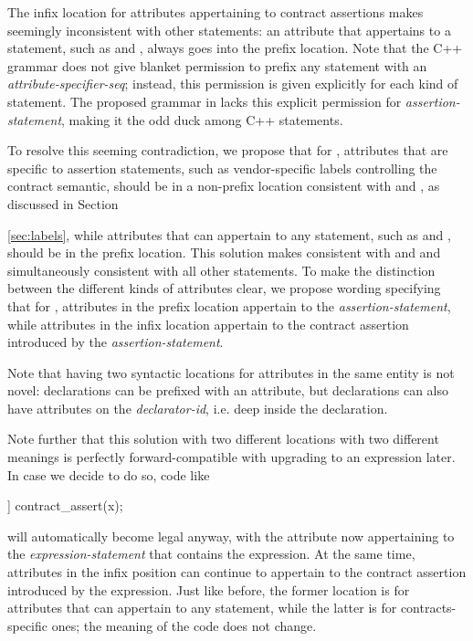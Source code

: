 The infix location for attributes appertaining to contract assertions makes  seemingly inconsistent with other statements: an attribute that appertains to a statement, such as \tcode{[[likely]]} and \tcode{[[unlikely]]}, always goes into the prefix location. Note that the C++ grammar does not give blanket permission to prefix any statement with an  \emph{attribute-specifier-seq}; instead, this permission is given explicitly for each kind of statement. The proposed grammar in \cite{P2900R5} lacks this explicit permission for \emph{assertion-statement}, making it the odd duck among C++ statements.

To resolve this seeming contradiction, we propose that for , attributes that are specific to assertion statements, such as vendor-specific labels controlling the contract semantic, should be in a non-prefix location consistent with  and , as discussed in Section {\ref{sec:labels}, while attributes that can appertain to any statement, such as \tcode{[[likely]]} and \tcode{[[unlikely]]}, should be in the prefix location. This solution makes  consistent with  and  and simultaneously consistent with all other statements. To make the distinction between the different kinds of attributes clear, we propose wording specifying that for , attributes in the prefix location appertain to the \emph{assertion-statement}, while attributes in the infix location appertain to the contract assertion introduced by the \emph{assertion-statement}.

Note that having two syntactic locations for attributes in the same entity is not novel: declarations can be prefixed with an attribute, but declarations can also have attributes on the \emph{declarator-id}, i.e. deep inside the declaration.

Note further that this solution with two different locations with two different meanings is perfectly forward-compatible with upgrading  to an expression later. In case we decide to do so, code like
\begin{codeblock}
[[likely]] contract_assert(x);
\end{codeblock}
will automatically become legal anyway, with the \tcode{[[likely]]} attribute now appertaining to the \emph{expression-statement} that contains the  expression. At the same time, attributes in the infix position can continue to appertain to the contract assertion introduced by the expression. Just like before, the former location is for attributes that can appertain to any statement, while the latter is for contracts-specific ones; the meaning of the code does not change.

}
